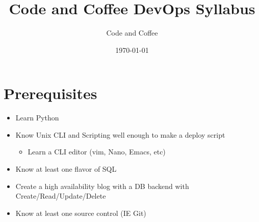 \documentclass[12pt]{article}
\title{Code and Coffee DevOps Syllabus}
\author{Code and Coffee}
\date{\today}
\begin{document}
\maketitle

\section{Prerequisites}
\begin{itemize}
\item Learn Python
\item Know Unix CLI and Scripting well enough to make a deploy script
  \begin{itemize}
  \item Learn a CLI editor (vim, Nano, Emacs, etc)
  \end{itemize}
\item Know at least one flavor of SQL
\item Create a high availability blog with a DB backend with Create/Read/Update/Delete
\item Know at least one source control (IE Git)
\end{itemize}
\end{document}
